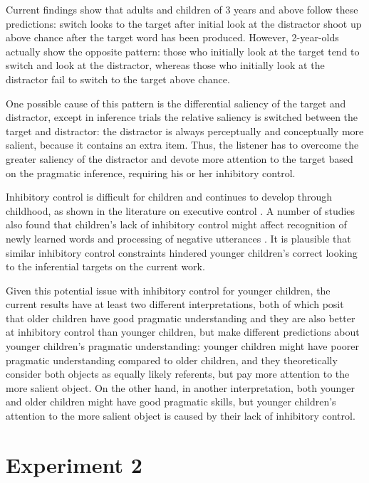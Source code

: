 \documentclass[10pt,letterpaper]{article}
\begin{document}
Current findings show that adults and children of 3 years and above follow these predictions: switch looks to the target after initial look at the distractor shoot up above chance after the target word has been produced. However, 2-year-olds actually show the opposite pattern: those who initially look at the target tend to switch and look at the distractor, whereas those who initially look at the distractor fail to switch to the target above chance. 

One possible cause of this pattern is the differential saliency of the target and distractor, except in inference trials the relative saliency is switched between the target and distractor: the distractor is always perceptually and conceptually more salient, because it contains an extra item. Thus, the listener has to overcome the greater saliency of the distractor and devote more attention to the target based on the pragmatic inference, requiring his or her inhibitory control. 

Inhibitory control is difficult for children and continues to develop through childhood, as shown in the literature on executive control \cite{davidson2006development, gerardi2000sensitivity}. A number of studies also found that children's lack of inhibitory control might affect recognition of newly learned words \cite{yurovskybeyond} and processing of negative utterances \cite{nordmeyer2013measuring}. It is plausible that similar inhibitory control constraints hindered younger children's correct looking to the inferential targets on the current work. 

Given this potential issue with inhibitory control for younger children, the current results have at least two different interpretations, both of which posit that older children have good pragmatic understanding and they are also better at inhibitory control than younger children, but make different predictions about younger children's pragmatic understanding: younger children might have poorer pragmatic understanding compared to older children, and they theoretically consider both objects as equally likely referents, but pay more attention to the more salient object. On the other hand, in another interpretation, both younger and older children might have good pragmatic skills, but younger children's attention to the more salient object is caused by their lack of inhibitory control. 

\section{Experiment 2}
\end{document}

